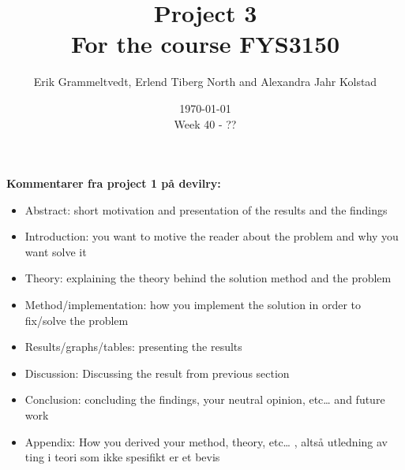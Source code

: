 \documentclass{article}
\begin{document}
\addtocounter{page}{0}

\title{Project 3 \\
      \large For the course FYS3150}
\date{\today \\
    \vspace{1mm}
    \large Week 40 - ??}

\author{Erik Grammeltvedt, Erlend Tiberg North and Alexandra Jahr Kolstad}

\maketitle




\newpage
\clearpage

\textbf{Kommentarer fra project 1 på devilry:}

\begin{itemize}

\item Abstract: short motivation and presentation of the results and the findings \\

\item Introduction: you want to motive the reader about the problem and why you want solve it \\

\item Theory: explaining the theory behind the solution method and the problem \\

\item Method/implementation: how you implement the solution in order to fix/solve the problem \\

\item Results/graphs/tables: presenting the results \\

\item Discussion: Discussing the result from previous section \\

\item Conclusion: concluding the findings, your neutral opinion, etc… and future work \\

\item Appendix: How you derived your method, theory, etc… , altså utledning av ting i teori som ikke spesifikt er et bevis \\

\end{itemize}
\end{document}

